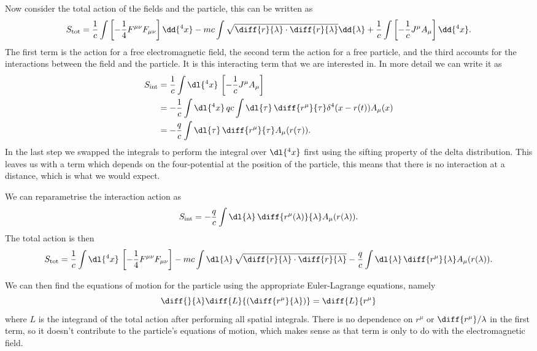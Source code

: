 \documentclass[fleqn]{NotesClass}
\newcommand*{\lagrangian}{L}
\begin{document}
    Now consider the total action of the fields and the particle, this can be written as
    \begin{equation}
        S_{\text{tot}} = \frac{1}{c}\int \left[ -\frac{1}{4}F^{\mu\nu}F_{\mu\nu} \right] \dd{^4x} - mc \int \sqrt{\diff{r}{\lambda} \cdot \diff{r}{\lambda}} \dd{\lambda} + \frac{1}{c} \int \left[ -\frac{1}{c}J^\mu A_\mu \right] \dd{^4x}.
    \end{equation}
    The first term is the action for a free electromagnetic field, the second term the action for a free particle, and the third accounts for the interactions between the field and the particle.
    It is this interacting term that we are interested in.
    In more detail we can write it as
    \begin{align}
        S_{\text{int}} &= \frac{1}{c}\int \dl{^4x} \, \left[ -\frac{1}{c}J^\mu A_\mu \right]\\
        &= -\frac{1}{c} \int \dl{^4x} \, qc \int \dl{\tau} \, \diff{r^\mu}{\tau} \delta^4(x - r(t)) A_\mu(x)\\
        &= -\frac{q}{c} \int \dl{\tau} \, \diff{r^\mu}{\tau} A_\mu(r(\tau)).
    \end{align}
    In the last step we swapped the integrals to perform the integral over \(\dl{^4x}\) first using the sifting property of the delta distribution.
    This leaves us with a term which depends on the four-potential at the position of the particle, this means that there is no interaction at a distance, which is what we would expect.
    
    We can reparametrise the interaction action as
    \begin{equation}
        S_{\text{int}} = -\frac{q}{c} \int \dl{\lambda} \, \diff{r^\mu(\lambda)}{\lambda} A_\mu(r(\lambda)).
    \end{equation}
    The total action is then
    \begin{equation}
        S_{\text{tot}} = \frac{1}{c}\int \dl{^4x}\, \left[ -\frac{1}{4}F^{\mu\nu}F_{\mu\nu} \right] -mc \int \dl{\lambda} \, \sqrt{\diff{r}{\lambda} \cdot \diff{r}{\lambda}} - \frac{q}{c} \int \dl{\lambda} \, \diff{r^\mu}{\lambda} A_\mu(r(\lambda)).
    \end{equation}
    
    We can then find the equations of motion for the particle using the appropriate Euler-Lagrange equations, namely
    \begin{equation}
        \diff{}{\lambda} \diff{\lagrangian}{(\diff{r^\mu}{\lambda})} = \diff{\lagrangian}{r^\mu}
    \end{equation}
    where \(\lagrangian\) is the integrand of the total action after performing all spatial integrals.
    There is no dependence on \(r^\mu\) or \(\diff{r^\mu}/{\lambda}\) in the first term, so it doesn't contribute to the particle's equations of motion, which makes sense as that term is only to do with the electromagnetic field.
    
\end{document}
